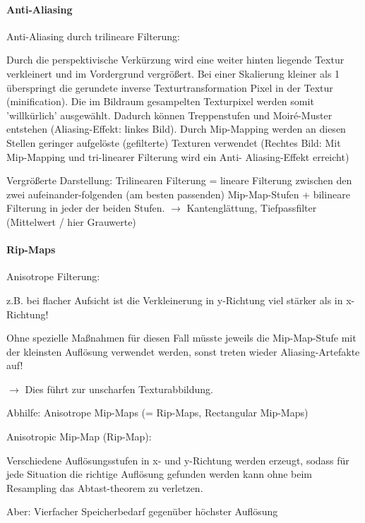\documentclass[landscape]{article}
\begin{document}
\begin{multicols}{3}
  \paragraph{Anti-Aliasing}
  Anti-Aliasing durch trilineare Filterung:
  \begin{itemize*}
    \item Durch die perspektivische Verkürzung wird eine weiter hinten liegende Textur verkleinert und im Vordergrund vergrößert. Bei einer Skalierung kleiner als 1 überspringt die gerundete inverse Texturtransformation Pixel in der Textur (minification). Die im Bildraum gesampelten Texturpixel werden somit 'willkürlich' ausgewählt. Dadurch können Treppenstufen und Moiré-Muster entstehen (Aliasing-Effekt: linkes Bild). Durch Mip-Mapping werden an diesen Stellen geringer aufgelöste (gefilterte) Texturen verwendet (Rechtes Bild: Mit Mip-Mapping und tri-linearer Filterung wird ein Anti- Aliasing-Effekt erreicht)
    \item Vergrößerte Darstellung: Trilinearen Filterung = lineare Filterung zwischen den zwei aufeinander-folgenden (am besten passenden) Mip-Map-Stufen + bilineare Filterung in jeder der beiden Stufen. $\rightarrow$ Kantenglättung, Tiefpassfilter (Mittelwert / hier Grauwerte)
  \end{itemize*}
  
  
  \paragraph{Rip-Maps}
  Anisotrope Filterung: 
  \begin{itemize*}
    \item z.B. bei flacher Aufsicht ist die Verkleinerung in y-Richtung viel stärker als in x-Richtung!
    \item Ohne spezielle Maßnahmen für diesen Fall müsste jeweils die Mip-Map-Stufe mit der kleinsten Auflösung verwendet werden, sonst treten wieder Aliasing-Artefakte auf!
    \item $\rightarrow$ Dies führt zur unscharfen Texturabbildung.
    \item Abhilfe: Anisotrope Mip-Maps (= Rip-Maps, Rectangular Mip-Maps)
  \end{itemize*}
  
  Anisotropic Mip-Map (Rip-Map):
  \begin{itemize*}
    \item Verschiedene Auflösungsstufen in x- und y-Richtung werden erzeugt, sodass für jede Situation die richtige Auflösung gefunden werden kann ohne beim Resampling das Abtast-theorem zu verletzen.
    \item Aber: Vierfacher Speicherbedarf gegenüber höchster Auflösung
  \end{itemize*}
  

\end{multicols}
\end{document}

